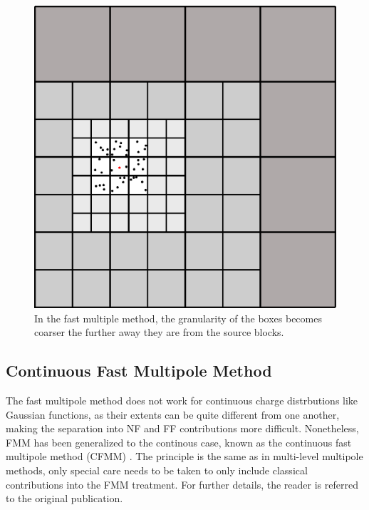\begin{figure}
\centering
\includegraphics[scale=0.35]{Pics/FMM2}
\caption{In the fast multiple method, the granularity of the boxes becomes coarser the further away they are from the source blocks.}
\label{fig:FMM2}
\end{figure}


\subsection{Continuous Fast Multipole Method}

The fast multipole method does not work for continuous charge distrbutions like Gaussian functions, as their extents can be quite different from one another, making the separation into NF and FF contributions more difficult. Nonetheless, FMM has been generalized to the continous case, known as the continuous fast multipole method (CFMM) \cite{Whi1996}. The principle is the same as in multi-level multipole methods, only special care needs to be taken to only include classical contributions into the FMM treatment. For further details, the reader is referred to the original publication. 

